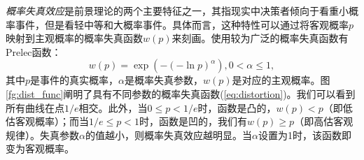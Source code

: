 \emph{概率失真效应}是前景理论的两个主要特征之一，其指现实中决策者倾向于看重小概率事件，但是看轻中等和大概率事件。具体而言，这种特性可以通过将客观概率$p$映射到主观概率的概率失真函数$w(p)$来刻画。使用较为广泛的概率失真函数有Prelec函数\cite{Prelec}：
\begin{equation}\label{eq:distortion}
w(p)=\exp(-(-\ln p)^{\alpha}), 0<\alpha\leq 1,
\end{equation}
其中$p$是事件的真实概率，$\alpha$是概率失真参数，$w(p)$是对应的主观概率。图\ref{fg:dist_func}阐明了具有不同参数的概率失真函数(\ref{eq:distortion})。我们可以看到所有曲线在点$1/e$相交。此外，当$0\leq p < 1/e$时，函数是凸的，$w(p)<p$（即低估客观概率）；而当$1/e\leq p<1$时，函数是凹的，我们有$w(p)\geq p$（即高估客观规律）。失真参数$\alpha$的值越小，则概率失真效应越明显。当$\alpha$设置为1时，该函数即变为客观概率。
